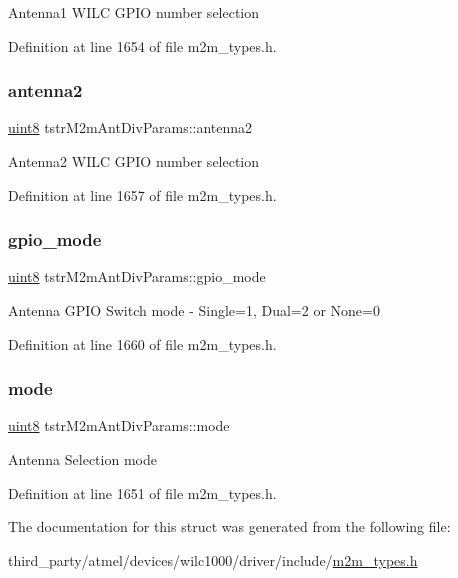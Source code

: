 Antenna1 W\+I\+LC G\+P\+IO number selection 

Definition at line 1654 of file m2m\+\_\+types.\+h.

\mbox{\label{structtstrM2mAntDivParams_a0fc2c68970b7b3043212ecb31aca7b6e}} 
\subsubsection{\texorpdfstring{antenna2}{antenna2}}
{\footnotesize\ttfamily \hyperlink{group__DataT_ga4df709a77647e870bbf1d955b8edc9a6}{uint8} tstr\+M2m\+Ant\+Div\+Params\+::antenna2}

Antenna2 W\+I\+LC G\+P\+IO number selection 

Definition at line 1657 of file m2m\+\_\+types.\+h.

\mbox{\label{structtstrM2mAntDivParams_aac8968943b7f201b4645522d7d7e9176}} 
\subsubsection{\texorpdfstring{gpio\+\_\+mode}{gpio\_mode}}
{\footnotesize\ttfamily \hyperlink{group__DataT_ga4df709a77647e870bbf1d955b8edc9a6}{uint8} tstr\+M2m\+Ant\+Div\+Params\+::gpio\+\_\+mode}

Antenna G\+P\+IO Switch mode -\/ Single=1, Dual=2 or None=0 

Definition at line 1660 of file m2m\+\_\+types.\+h.

\mbox{\label{structtstrM2mAntDivParams_aba1e7d2c9097e415a542ce1f0da60f34}} 
\subsubsection{\texorpdfstring{mode}{mode}}
{\footnotesize\ttfamily \hyperlink{group__DataT_ga4df709a77647e870bbf1d955b8edc9a6}{uint8} tstr\+M2m\+Ant\+Div\+Params\+::mode}

Antenna Selection mode 

Definition at line 1651 of file m2m\+\_\+types.\+h.



The documentation for this struct was generated from the following file\+:\begin{DoxyCompactItemize}
\item 
third\+\_\+party/atmel/devices/wilc1000/driver/include/\hyperlink{m2m__types_8h}{m2m\+\_\+types.\+h}\end{DoxyCompactItemize}
